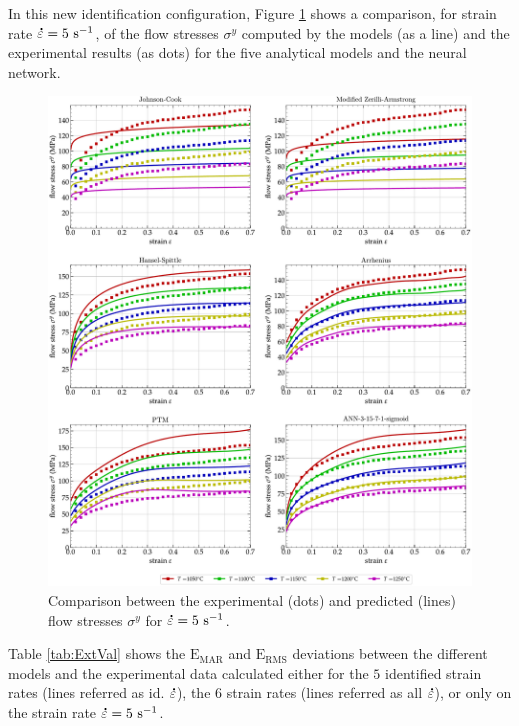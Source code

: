 \documentclass[metals,article,accept,pdftex,moreauthors]{Definitions/mdpi}
\DeclareRobustCommand{\mdot}[1]{\accentset{\mbox{\bfseries .}}{#1}}
\DeclareRobustCommand{\RMSE}{\text{E}_\text{RMS}}
\DeclareRobustCommand{\MARE}{\text{E}_\text{MAR}}
\DeclareRobustCommand{\ps}{\text{s}^{-1}}
\begin{document}
In this new identification configuration, Figure \ref{fig:CompExt} shows a comparison, for strain rate $\mdot\varepsilon=5~\ps$, of the flow stresses $\sigma^y$ computed by the models (as a line) and the experimental results (as dots) for the five analytical models and the neural network.
\begin{figure}[H]

\includegraphics[width=0.98\columnwidth]
{Figures/CompExt}
\caption{Comparison between the experimental (dots) and predicted (lines) flow stresses $\sigma^y$ for $\mdot\varepsilon=5~\ps$.}
\label{fig:CompExt}
\end{figure}
Table \ref{tab:ExtVal} shows the $\MARE$ and $\RMSE$ deviations between the different models and the experimental data calculated either for the $5$ identified strain rates (lines referred as id. $\mdot\varepsilon$), the $6$ strain rates (lines referred as all $\mdot\varepsilon$), or only on the strain rate $\mdot\varepsilon=5~\ps$.
\end{document}
